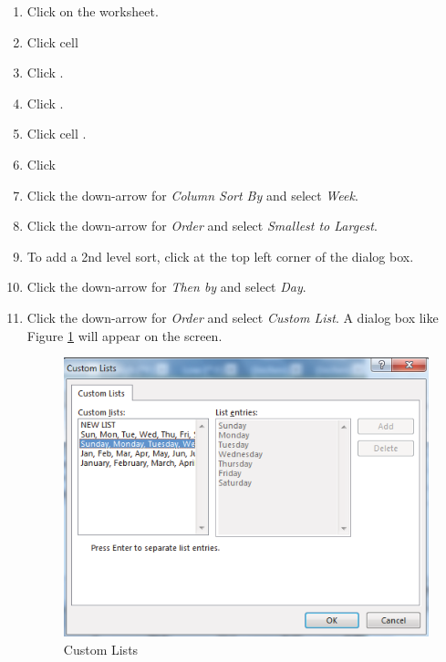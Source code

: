 \begin{enumbox}
	\begin{enumerate}
		\item Click on the  worksheet.
		\item Click cell 
		\item Click .
		\item Click .
		\item Click cell .
		\item Click 	
		\item Click the down-arrow for \textit{Column Sort By} and select \textit{Week}.
		\item Click the down-arrow for \textit{Order} and select \textit{Smallest to Largest}.
		\item To add a 2nd level sort, click  at the top left corner of the dialog box.
		\item Click the down-arrow for \textit{Then by} and select \textit{Day}.
		\item Click the down-arrow for \textit{Order} and select \textit{Custom List}. A dialog box like Figure \ref{05:fig13} will appear on the screen.

		\begin{figure}[H]
			\centering
			\includegraphics[width=\maxwidth{.95\linewidth}]{gfx/ch05_fig13}
			\caption{Custom Lists}
			\label{05:fig13}
		\end{figure}


\end{enumerate}
\end{enumbox}
